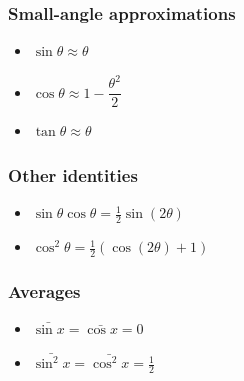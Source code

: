 \documentclass[]{report}
\newcommand \tab[1][1cm]{\hspace*{#1}}
\newcommand{\itemt}{\item \tab}
\begin{document}
\subsubsection{Small-angle approximations}
\begin{itemize}
\itemt \( \sin\theta \approx \theta \)
\itemt \( \cos\theta \approx 1 - \dfrac{\theta^2}{2} \)
\itemt \( \tan\theta \approx \theta \)
\end{itemize}

\subsubsection{Other identities}
\begin{itemize}
\itemt \( \sin \theta \cos \theta = \frac{1}{2} \sin(2\theta) \)
\itemt \( \cos^2\theta = \frac{1}{2} (\cos(2\theta)+1) \)
\end{itemize}

\subsubsection{Averages}
\begin{itemize}
\itemt \( \bar{\sin x} = \bar{\cos x} = 0 \)
\itemt \( \bar{\sin^2x} = \bar{\cos^2x}= \frac{1}{2} \)
\end{itemize}

\def\arraystretch{2.8}
\end{document}
